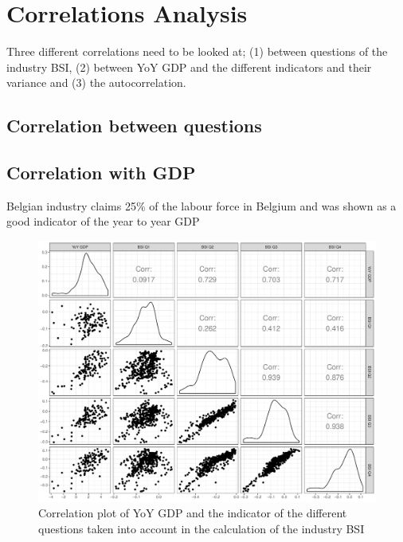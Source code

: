\documentclass[12pt,a4paper,oneside]{book}
\begin{document}
\section{Correlations Analysis}

Three different correlations need to be looked at; (1) between questions of the industry BSI, (2) between YoY GDP and the different indicators and their variance and (3) the autocorrelation.

\subsection{Correlation between questions}

 

\subsection{Correlation with GDP}

Belgian industry claims 25\% of the labour force in Belgium and was shown as a good indicator of the year to year GDP
\cite{de_greef_national_2009}

\begin{figure}[!htbp]
    \centering
    \includegraphics[scale=0.5]{Graphs/Corr_GDP_Questions.pdf}
    \caption{Correlation plot of YoY GDP and the indicator of the different questions taken into account in the calculation of the industry BSI}
    \label{fig:ggpairs}
\end{figure}
\end{document}
